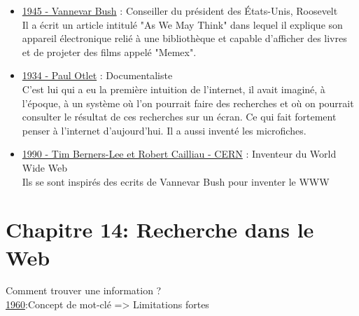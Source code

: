 \documentclass{article}
\begin{document}
    \begin{itemize}
        \item \underline{1945 - Vannevar Bush} : Conseiller du président des États-Unis, Roosevelt\\ 
        Il a écrit un article intitulé "As We May Think" dans lequel il explique son appareil électronique relié à une bibliothèque et capable d'afficher des livres et de projeter des films appelé "Memex".
        \item \underline{1934 - Paul Otlet} : Documentaliste\\ 
        C'est lui qui a eu la première intuition de l'internet, il avait imaginé, à l'époque, à un système où l'on pourrait faire des recherches et où on pourrait consulter le résultat de ces recherches sur un écran. Ce qui fait fortement penser à l'internet d'aujourd'hui. Il a aussi inventé les microfiches.
        \item \underline{1990 - Tim Berners-Lee et  Robert Cailliau - CERN} : Inventeur du World Wide Web\\
        Ils se sont inspirés des ecrits de Vannevar Bush pour inventer le WWW
    \end{itemize}
    
\vspace * {0.5cm}   
\hline 


\section{Chapitre 14: Recherche dans le Web}
Comment trouver une information ?\\

\underline{1960}:Concept de mot-clé => Limitations fortes
\end{document}

